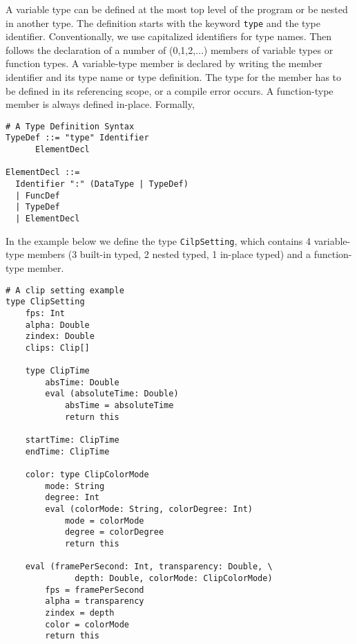 \documentclass[12pt]{article}
\begin{document}
A variable type can be defined at the most top level of the program or be nested in another type. The definition starts with the keyword \texttt{type} and the type identifier. Conventionally, we use capitalized identifiers for type names. Then follows the declaration of a number of (0,1,2,$\dots$) members of variable types or function types. A variable-type member is declared by writing the member identifier and its type name or type definition. The type for the member has to be defined in its referencing scope, or a compile error occurs. A function-type member is always defined in-place. Formally,
\begin{mdframed}[backgroundcolor=lightgray,hidealllines=true]
\begin{verbatim}
# A Type Definition Syntax
TypeDef ::= "type" Identifier
      ElementDecl
            
ElementDecl ::=  
  Identifier ":" (DataType | TypeDef)
  | FuncDef
  | TypeDef
  | ElementDecl
\end{verbatim}
\end{mdframed}
In the example below we define the type \texttt{CilpSetting}, which contains 4 variable-type members (3 built-in typed, 2 nested typed, 1 in-place typed) and a function-type member.
\begin{mdframed}[backgroundcolor=lightgray,hidealllines=true]
\begin{verbatim}
# A clip setting example
type ClipSetting
    fps: Int
    alpha: Double
    zindex: Double
    clips: Clip[]
    
    type ClipTime
        absTime: Double
        eval (absoluteTime: Double)
            absTime = absoluteTime
            return this
    
    startTime: ClipTime
    endTime: ClipTime
    
    color: type ClipColorMode
        mode: String
        degree: Int
        eval (colorMode: String, colorDegree: Int)
            mode = colorMode
            degree = colorDegree
            return this
            
    eval (framePerSecond: Int, transparency: Double, \
              depth: Double, colorMode: ClipColorMode)
        fps = framePerSecond
        alpha = transparency
        zindex = depth
        color = colorMode
        return this
\end{verbatim}
\end{mdframed}

\end{document}
